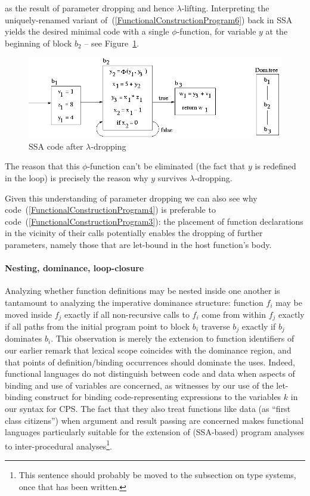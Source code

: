 as the result of parameter dropping and hence
$\lambda$-lifting. Interpreting the uniquely-renamed variant
of~(\ref{FunctionalConstructionProgram6}) back in SSA yields the
desired minimal code with a single $\phi$-function, for variable $y$
at the beginning of block $b_2$ -- see
Figure~\ref{fig:FunctionalCorrespondenceSSAofLambdaDroppedCode}.
\begin{figure}
\begin{center}
\includegraphics[scale=0.6]{SSAConstructionExample3.png}
\end{center}
\caption{\label{fig:FunctionalCorrespondenceSSAofLambdaDroppedCode} SSA code after $\lambda$-dropping}
\end{figure}
The reason that this $\phi$-function can't be eliminated (the fact
that $y$ is redefined in the loop) is precisely the reason why $y$
survives $\lambda$-dropping.

Given this understanding of parameter dropping we can also see why
code~(\ref{FunctionalConstructionProgram4}) is preferable to
code~(\ref{FunctionalConstructionProgram3}): the placement of function
declarations in the vicinity of their calls potentially enables the
dropping of further parameters, namely those that are let-bound in the
host function's body.

\paragraph{Nesting, dominance, loop-closure}

Analyzing whether function definitions may be nested inside one
another is tantamount to analyzing the imperative dominance structure:
function $f_i$ may be moved inside $f_j$ exactly if all non-recursive
calls to $f_i$ come from within $f_j$ exactly if all paths from the
initial program point to block $b_i$ traverse $b_j$ exactly if $b_j$
dominates $b_i$.  This observation is merely the extension to function
identifiers of our earlier remark that lexical scope coincides with
the dominance region, and that points of definition/binding
occurrences should dominate the uses. Indeed, functional languages do
not distinguish between code and data when aspects of binding and use
of variables are concerned, as witnesses by our use of the let-binding
construct for binding code-representing expressions to the variables
$k$ in our syntax for CPS. The fact that they also treat functions
like data (as ``first class citizens'') when argument and result
passing are concerned makes functional languages particularly suitable
for the extension of (SSA-based) program analyses to inter-procedural
analyses\footnote{This sentence should probably be moved to the
  subsection on type systems, once that has been written.}.

